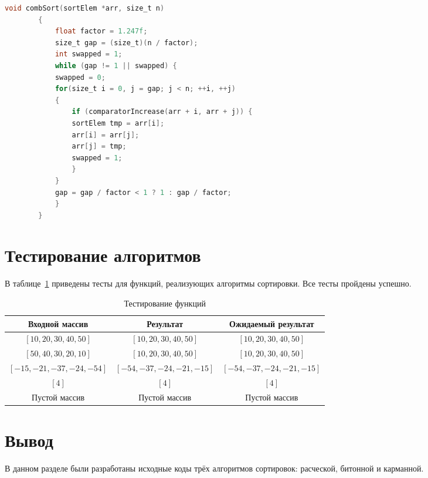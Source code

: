 \documentclass[12pt]{report}
\begin{document}
	\bigbreak

	\begin{lstlisting}[label=insertion-code,caption=Листинг сортировки расческой,language=C]
		void combSort(sortElem *arr, size_t n)
		{
		    float factor = 1.247f;
		    size_t gap = (size_t)(n / factor);
		    int swapped = 1;
		    while (gap != 1 || swapped) {
			swapped = 0;
			for(size_t i = 0, j = gap; j < n; ++i, ++j)
			{
			    if (comparatorIncrease(arr + i, arr + j)) {
				sortElem tmp = arr[i];
				arr[i] = arr[j];
				arr[j] = tmp;
				swapped = 1;
			    }
			}
			gap = gap / factor < 1 ? 1 : gap / factor;
		    }
		}
	\end{lstlisting}

	\section{Тестирование алгоритмов}

	В таблице~\ref{tbl:test} приведены тесты для функций, реализующих алгоритмы сортировки. Все тесты пройдены успешно.
	
	\begin{table}[h!]
		\begin{center}
			\begin{tabular}{|c|c|c|}
				\hline
				Входной массив & Результат & Ожидаемый результат \\ 
				\hline
				$[10, 20, 30, 40, 50]$ & $[10, 20, 30, 40, 50]$  & $[10, 20, 30, 40, 50]$\\\hline
				$[50, 40, 30, 20, 10]$  & $[10, 20, 30, 40, 50]$ & $[10, 20, 30, 40, 50]$\\\hline
				$[-15, -21, -37, -24, -54]$  & $[-54, -37, -24, -21, -15]$  & $[-54, -37, -24, -21, -15]$\\\hline
				$[4]$  & $[4]$  & $[4]$\\\hline
				Пустой массив  & Пустой массив  & Пустой массив\\
				\hline
			\end{tabular}
			\caption{\label{tbl:test}Тестирование функций}
		\end{center}
	\end{table}

	\section{Вывод}
	
	В данном разделе были разработаны исходные коды трёх алгоритмов сортировок: расческой, битонной и карманной.
	
\end{document}
